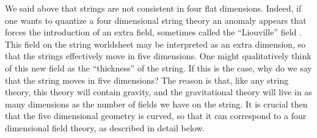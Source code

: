 We said above that  strings are not consistent in four flat
dimensions. Indeed, if one wants to quantize a four dimensional
string theory an anomaly appears that forces the introduction 
of an extra field, sometimes called the 
``Liouville'' field \cite{Polyakov:1981rd}. 
This field on the string worldsheet may be interpreted as an extra 
dimension, so that the
strings effectively move in five dimensions. One might
qualitatively think of this new field as the ``thickness'' of the string.
If this is the case, why do we say that the string  moves in 
five dimensions? The reason is that, like any string theory, this 
theory will
contain gravity, and the gravitational theory will live in as
many dimensions as the number of fields we have on the string. 
It is crucial then that the five dimensional geometry is curved, so that
it can correspond to a four dimensional field theory, as described in
detail below. 

